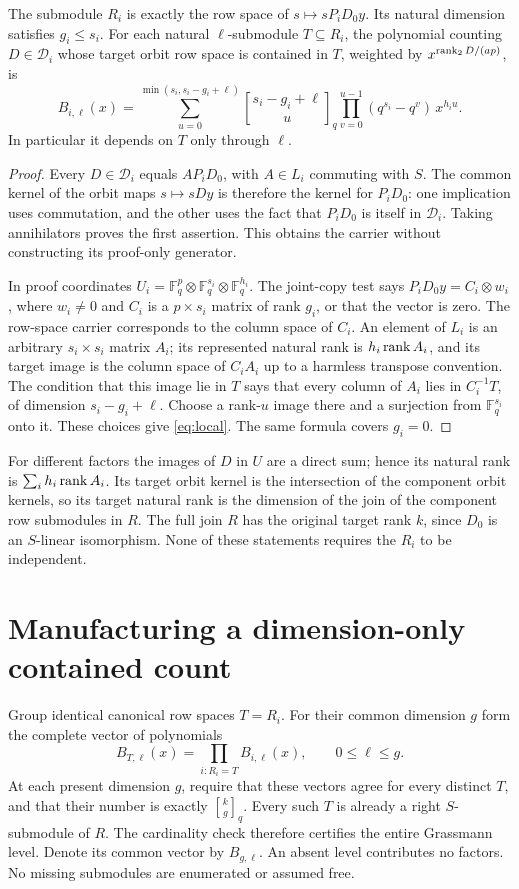 \documentclass[11pt]{article}
\newcommand{\F}{\mathbb F}\newcommand{\End}{\operatorname{End}}
\begin{document}
\begin{lemma}
The submodule $R_i$ is exactly the row space of
$s\mapsto sP_iD_0y$. Its natural dimension satisfies $g_i\le s_i$.
For each natural $\ell$-submodule $T\subseteq R_i$, the polynomial counting
$D\in\mathcal D_i$ whose target orbit row space is contained in $T$,
weighted by $x^{\operatorname{rank}_2D/(ap)}$, is
\begin{equation}\label{eq:local}
 B_{i,\ell}(x)=\sum_{u=0}^{\min(s_i,s_i-g_i+\ell)}
 {s_i-g_i+\ell\brack u}_q
 \prod_{v=0}^{u-1}(q^{s_i}-q^v)\,x^{h_i u}.
\end{equation}
In particular it depends on $T$ only through $\ell$.
\end{lemma}
\begin{proof}
Every $D\in\mathcal D_i$ equals $AP_iD_0$, with $A\in L_i$ commuting
with $S$. The common kernel of the orbit maps $s\mapsto sDy$ is therefore
the kernel for $P_iD_0$: one implication uses commutation, and the other
uses the fact that $P_iD_0$ is itself in $\mathcal D_i$. Taking annihilators
proves the first assertion. This obtains the carrier without constructing
its proof-only generator.

In proof coordinates $U_i=\F_q^p\otimes\F_q^{s_i}\otimes\F_q^{h_i}$.
The joint-copy test says $P_iD_0y=C_i\otimes w_i$, where $w_i\ne0$ and
$C_i$ is a $p\times s_i$ matrix of rank $g_i$, or that the vector is zero.
The row-space carrier corresponds to the column space of $C_i$.
An element of $L_i$ is an arbitrary $s_i\times s_i$ matrix $A_i$;
its represented natural rank is $h_i\operatorname{rank} A_i$, and its target image is
the column space of $C_iA_i$ up to a harmless transpose convention.
The condition that this image lie in $T$ says that every column of $A_i$
lies in $C_i^{-1}T$, of dimension $s_i-g_i+\ell$.
Choose a rank-$u$ image there and a surjection from $\F_q^{s_i}$ onto it.
These choices give \eqref{eq:local}. The same formula covers $g_i=0$.
\end{proof}

For different factors the images of $D$ in $U$ are a direct sum; hence its
natural rank is $\sum_i h_i\operatorname{rank} A_i$. Its target orbit kernel is the
intersection of the component orbit kernels, so its target natural rank is
the dimension of the join of the component row submodules in $R$.
The full join $R$ has the original target rank $k$, since $D_0$ is an
$S$-linear isomorphism. None of these statements requires the $R_i$ to be
independent.

\section{Manufacturing a dimension-only contained count}
Group identical canonical row spaces $T=R_i$. For their common dimension $g$
form the complete vector of polynomials
\[
 B_{T,\ell}(x)=\prod_{i:R_i=T} B_{i,\ell}(x),\qquad0\le\ell\le g.
\]
At each present dimension $g$, require that these vectors agree for every
distinct $T$, and that their number is exactly ${k\brack g}_q$.
Every such $T$ is already a right $S$-submodule of $R$. The cardinality check
therefore certifies the entire Grassmann level. Denote its common vector by
$B_{g,\ell}$. An absent level contributes no factors. No missing submodules
are enumerated or assumed free.
\end{document}
